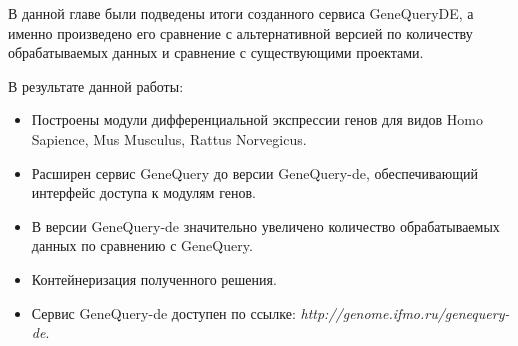 \documentclass[times,specification,annotation]{itmo-student-thesis}
\begin{document}
\chapterconclusion

В данной главе были подведены итоги созданного сервиса GeneQueryDE, а именно произведено его сравнение с альтернативной версией по количеству обрабатываемых данных и сравнение с существующими проектами. 
  

\startconclusionpage

В результате данной работы:
\begin{itemize}
    \item Построены модули дифференциальной экспрессии генов для видов Homo Sapience, Mus Musculus, Rattus Norvegicus.
    \item Расширен сервис GeneQuery до версии GeneQuery-de, обеспечивающий интерфейс доступа к модулям генов. 
    \item В версии GeneQuery-de значительно увеличено количество обрабатываемых данных по сравнению с GeneQuery. 
    \item Контейнеризация полученного решения.
    \item Сервис GeneQuery-de доступен по ссылке: \textit{http://genome.ifmo.ru/genequery-de}.​
\end{itemize}

\printmainbibliography
\end{document}
